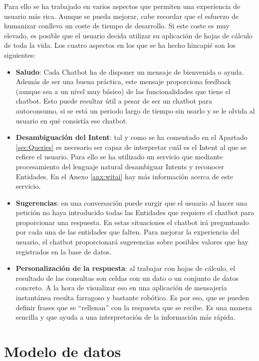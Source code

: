 Para ello se ha trabajado en varios aspectos que permiten una experiencia de usuario más rica. Aunque se pueda mejorar, cabe recordar que el esfuerzo de humanizar conlleva un coste de tiempo de desarrollo. Si este coste es muy elevado, es posible que el usuario decida utilizar su aplicación de hojas de cálculo de toda la vida. Los cuatro aspectos en los que se ha hecho hincapié son los siguientes:
\begin{itemize}
	\item \textbf{Saludo}: Cada Chatbot ha de disponer un mensaje de bienvenida o ayuda. Además de ser una buena práctica, este mensaje proporciona feedback (aunque sea a un nivel muy básico) de las funcionalidades que tiene el chatbot. Esto puede resultar útil a pesar de ser un chatbot para autoconsumo, si se está un periodo largo de tiempo sin usarlo y se le olvida al usuario en qué consistía ese chatbot.
	\item \textbf{Desambiguación del Intent}: tal y como se ha comentado en el Apartado \ref{sec:Queries} es necesario ser capaz de interpretar cuál es el Intent al que se refiere el usuario. Para ello se ha utilizado un servicio que mediante procesamiento del lenguaje natural desambiguar Intents y reconocer Entidades. En el Anexo \ref{anx:witai} hay más información acerca de este servicio.
	\item \textbf{Sugerencias}: en una conversación puede surgir que el usuario al hacer una petición no haya introducido todas las Entidades que requiere el chatbot para proporcionar una respuesta. En estas situaciones el chatbot irá preguntando por cada una de las entidades que falten. Para mejorar la experiencia del usuario, el chatbot proporcionará sugerencias sobre posibles valores que hay registrados en la base de datos.
	\item \textbf{Personalización de la respuesta}: al trabajar con hojas de cálculo, el resultado de las consultas son celdas con un dato o un conjunto de datos concreto. A la hora de visualizar eso en una aplicación de mensajería instantánea resulta farragoso y bastante robótico. Es por eso, que se pueden definir frases que se ``rellenan'' con la respuesta que se recibe. Es una manera sencilla y que ayuda a una interpretación de la información más rápida.
\end{itemize}

\section{Modelo de datos}
\label{sec:DataModel}

